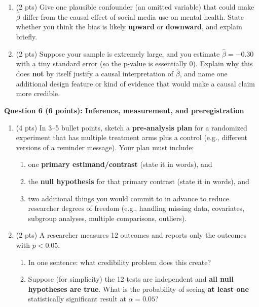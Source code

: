 \documentclass[12pt]{article}
\begin{document}
\begin{enumerate}[label=5\alph*)]
  \item (2 pts) Give one plausible confounder (an omitted variable) that could make $\hat\beta$ differ from the causal effect
  of social media use on mental health. State whether you think the bias is likely \textbf{upward} or \textbf{downward}, and explain briefly.

  \vspace{0.5em}
  \item (2 pts) Suppose your sample is extremely large, and you estimate $\hat\beta=-0.30$ with a tiny standard error
  (so the p-value is essentially 0). Explain why this does \textbf{not} by itself justify a causal interpretation
  of $\hat\beta$, and name one additional design feature or kind of evidence that would make a causal claim more credible.
\end{enumerate}

\vspace{1.0em}
\noindent\textbf{Question 6 (6 points): Inference, measurement, and preregistration}

\begin{enumerate}[label=6\alph*)]
  \item (4 pts) In 3--5 bullet points, sketch a \textbf{pre-analysis plan} for a randomized experiment that has
  multiple treatment arms plus a control (e.g., different versions of a reminder message).
  Your plan must include:
  \begin{enumerate}[label=\arabic*.]
    \item one \textbf{primary estimand/contrast} (state it in words), and
    \item the \textbf{null hypothesis} for that primary contrast (state it in words), and
    \item two additional things you would commit to in advance to reduce researcher degrees of freedom
    (e.g., handling missing data, covariates, subgroup analyses, multiple comparisons, outliers).
  \end{enumerate}

  \vspace{0.75em}
  \item (2 pts) A researcher measures 12 outcomes and reports only the outcomes with $p<0.05$.
  \begin{enumerate}[label=\arabic*.]
    \item In one sentence: what credibility problem does this create?
    \item Suppose (for simplicity) the 12 tests are independent and \textbf{all null hypotheses are true}.
    What is the probability of seeing \textbf{at least one} statistically significant result at $\alpha=0.05$?
  \end{enumerate}
\end{enumerate}
\end{document}
